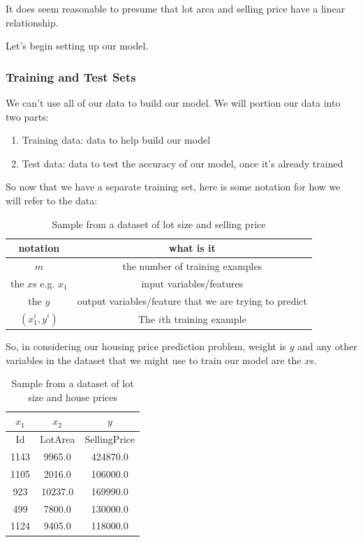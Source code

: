 \documentclass[12pt]{article}
\begin{document}
It does seem reasonable to presume that lot area and selling price have a linear relationship.

Let's begin setting up our model.

\subsubsection{Training and Test Sets}

We can't use all of our data to build our model. We will portion our data into two parts: 

\begin{enumerate}
\item Training data: data to help build our model
\item Test data: data to test the accuracy of our model, once it's already trained
\end{enumerate}

So now that we have a separate training set, here is some notation for how we will refer to the data:
\begin{table}[htp]
\caption{Sample from a dataset of lot size and selling price}
\begin{center}
\begin{tabular}{|c|c|}
\hline
notation & what is it \\ \hline
$m$ & the number of training examples \\
the $x$s e.g. $x_1$ & input variables/features \\ 
the $y$ & output variables/feature that we are trying to predict \\ 
$(x_1^i, y^i)$ & The $i$th training example  \\ 
\hline
\end{tabular}
\end{center}
\label{table:sample-table-notaton}
\end{table}%

So, in considering our housing price prediction problem, weight is $y$ and any other variables in the dataset that we might use to train our model are the $x$s. 

\begin{table}[htp]
\caption{Sample from a dataset of lot size and house prices}
\begin{center}
\begin{tabular}{|c|c|c|}
\hline
$x_1$ & $x_2$ & $y$ \\ \hline
Id & LotArea & SellingPrice  \\ \hline
1143 & 9965.0 & 424870.0 \\
1105 & 2016.0 & 106000.0 \\
923 & 10237.0 & 169990.0 \\
499& 7800.0 & 130000.0 \\
1124 & 9405.0 & 118000.0 \\
\hline
\end{tabular}
\end{center}
\label{table:house-prices-sample-table-xs}
\end{table}%
\end{document}
